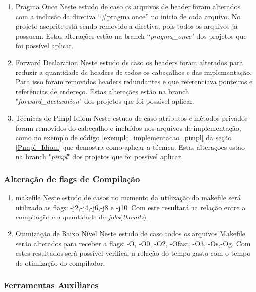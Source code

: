     \begin{enumerate}
        \item Pragma Once
        \subitem Neste estudo de caso os arquivos de header foram alterados
 com a inclusão da diretiva “\#pragma once” no inicio de cada arquivo.
 No projeto aseprite está sendo removido a diretiva, pois todos os arquivos já possuem.
Estas alterações estão na branch “\textit{pragma\_once}” dos projetos que foi possível aplicar.
        \item Forward Declaration
        \subitem Neste estudo de caso os headers foram alterados para reduzir
 a quantidade de headers de todos os cabeçalhos e das implementação.
 Para isso foram removidos headers redundantes e que referenciava
 ponteiros e referências de endereço.
Estas alterações estão na branch "\textit{forward\_declaration}" dos projetos que foi possível aplicar.
        \item Técnicas de Pimpl Idiom
        \subitem Neste estudo de caso atributos e métodos privados foram removidos do cabeçalho
 e incluídos nos arquivos de implementação, como no exemplo de código \ref{exemplo_implementacao_pimpl}
 da seção \ref{Pimpl_Idiom}
 que demostra como aplicar a técnica.
Estas alterações estão na branch "\textit{pimpl}" dos projetos que foi possível aplicar.
    \end{enumerate}

\subsubsection{Alteração de flags de Compilação}

        \begin{enumerate}
            \item makefile
                \subitem Neste estudo de casos no momento da utilização do makefile
 será utilizado as flags: -j2,-j4,-j6,-j8 e -j10. Com este resultará na relação entre
a compilação e a quantidade de \textit{jobs}(\textit{threads}).
            \item Otimização de Baixo Nível
                \subitem Neste estudo de caso todos os arquivos Makefile serão
 alterados para receber a flags: -O, -O0, -O2, -Ofast, -O3, -Os,-Og.
 Com estes resultados será possível verificar a relação do tempo gasto com
 o tempo de otimização do compilador.
        \end{enumerate}

\subsubsection{Ferramentas Auxiliares}

